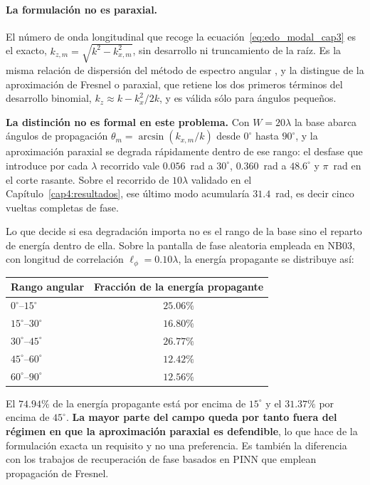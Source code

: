 \paragraph{La formulación no es paraxial.} El número de onda longitudinal que
recoge la ecuación~\eqref{eq:edo_modal_cap3} es el exacto,
$k_{z,m}=\sqrt{k^2-k_{x,m}^2}$, sin desarrollo ni truncamiento de la raíz. Es la
misma relación de dispersión del método de espectro angular
\parencite{carbajal2010espectro}, y la distingue de la aproximación de Fresnel o
paraxial, que retiene los dos primeros términos del desarrollo binomial,
$k_{z}\approx k-k_x^2/2k$, y es válida sólo para ángulos pequeños.

\textbf{La distinción no es formal en este problema.} Con $W=20\lambda$ la base
abarca ángulos de propagación $\theta_m=\arcsin(k_{x,m}/k)$ desde $0^\circ$ hasta
$90^\circ$, y la aproximación paraxial se degrada rápidamente dentro de ese
rango: el desfase que introduce por cada $\lambda$ recorrido vale $0.056$~rad a
$30^\circ$, $0.360$~rad a $48.6^\circ$ y $\pi$~rad en el corte rasante. Sobre el
recorrido de $10\lambda$ validado en el Capítulo~\ref{cap4:resultados}, ese
último modo acumularía $31.4$~rad, es decir cinco vueltas completas de fase.

Lo que decide si esa degradación importa no es el rango de la base sino el
reparto de energía dentro de ella. Sobre la pantalla de fase aleatoria empleada
en NB03, con longitud de correlación $\ell_\phi=0.10\lambda$, la energía
propagante se distribuye así:

\begin{center}
\begin{tabular}{lc}
\toprule
Rango angular & Fracción de la energía propagante \\
\midrule
$0^\circ$--$15^\circ$  & $25.06\%$ \\
$15^\circ$--$30^\circ$ & $16.80\%$ \\
$30^\circ$--$45^\circ$ & $26.77\%$ \\
$45^\circ$--$60^\circ$ & $12.42\%$ \\
$60^\circ$--$90^\circ$ & $12.56\%$ \\
\bottomrule
\end{tabular}
\end{center}

El $74.94\%$ de la energía propagante está por encima de $15^\circ$ y el
$31.37\%$ por encima de $45^\circ$. \textbf{La mayor parte del campo queda por
tanto fuera del régimen en que la aproximación paraxial es defendible}, lo que
hace de la formulación exacta un requisito y no una preferencia. Es también la
diferencia con los trabajos de recuperación de fase basados en PINN que emplean
propagación de Fresnel.

